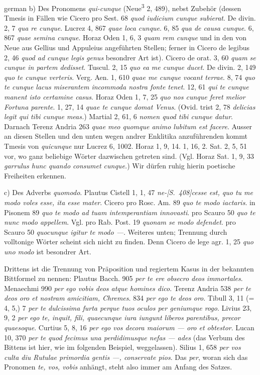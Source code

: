 \begin{otherlanguage*}{german}
b)	Des Pronomens \emph{qui-cunque} (Neue\textsuperscript{3} 2, 489), nebst Zubehör (dessen Tmesis in Fällen wie Cicero pro Sest. 68 \emph{quod iudicium cunque subierat}. De divin. 2, 7 \emph{qua re cunque}. Lucrez 4, 867 \emph{quae loca cunque}. 6, 85 \emph{qua de causa cunque}. 6, 867 \emph{quae semina cunque}. Horaz Oden 1, 6, 3 \emph{quam rem cunque} und in den von Neue aus Gellius und Appuleius angeführten Stellen; ferner in Cicero de legibus 2, 46 \emph{quod ad cunque legis genus} besondrer Art ist). Cicero de orat. 3, 60 \emph{quam se cunque in partem dedisset}. Tuscul. 2, 15 \emph{quo ea me cunque ducet}. De divin. 2, 149 \emph{quo te cunque verteris}. Verg. Aen. 1, 610 \emph{quae me cunque vocant terrae}. 8, 74 \emph{quo te cunque lacus miserantem incommoda nostra fonte tenet}. 12, 61 \emph{qui te cunque manent isto certamine casus}. Horaz Oden 1, 7, 25 \emph{quo nos cunque feret melior Fortuna parente}. 1, 27, 14 \emph{quae te cunque domat Venus}. (Ovid. trist 2, 78 \emph{delicias legit qui tibi cunque meas.}) Martial 2, 61, 6 \emph{nomen quod tibi cunque datur}. Darnach Terenz Andria 263 \emph{quae meo quomque animo lubitum est facere}. Ausser an diesen Stellen und den unten wegen andrer Enklitika anzuführenden kommt Tmesis von \emph{quicunque} nur Lucrez 6, 1002. Horaz 1, 9, 14. 1, 16, 2. Sat. 2, 5, 51 vor, wo ganz beliebige Wörter dazwischen getreten sind. (Vgl. Horaz Sat. 1, 9, 33 \emph{garrulus hunc quando consumet cunque.}) Wir dürfen ruhig hierin poetische Freiheiten erkennen.

c)	Des Adverbs \emph{quomodo}. Plautus Cistell 1, 1, 47 \emph{ne-}\hypertarget{p408}{\emph{[S.~408]}}\label{p408}\emph{cesse est, quo tu me modo voles esse, ita esse mater}. Cicero pro Rosc. Am. 89 \emph{quo te modo iactaris}. in Pisonem 89 \emph{quo te modo ad tuam intemperantiam innovasti}. pro Scauro 50 \emph{quo te nunc modo appellem}. Vgl. pro Rab. Post. 19 \emph{quonam se modo defendet}. pro Scauro 50 \emph{quocunque igitur te modo —}. Weiteres unten; Trennung durch volltonige Wörter scheint sich nicht zu finden. Denn Cicero de lege agr. 1, 25 \emph{quo uno modo} ist besondrer Art.

Drittens ist die Trennung von Präposition und regiertem Kasus in der bekannten Bittformel zu nennen: Plautus Bacch. 905 \emph{per te ere obsecro deos immortales}. Menaechmi 990 \emph{per ego vobis deos atque homines dico}. Terenz Andria 538 \emph{per te deos oro et nostram amicitiam, Chremes}. 834 \emph{per ego te deos oro}. Tibull 3, 11 (= 4, 5,) 7 \emph{per te dulcissima furta perque tuos oculos per geniumque rogo}. Livius 23, 9, 2 \emph{per ego te, inquit, fili, quaecunque iura iungunt liberos parentibus, precor quaesoque}. Curtius 5, 8, 16 \emph{per ego vos decora maiorum — oro et obtestor}. Lucan 10, 370 \emph{per te quod fecimus una perdidimusque nefas — ades} (das Verbum des Bittens ist hier, wie im folgenden Beispiel, weggelassen). Silius 1, 658 \emph{per vos culta diu Rutulae primordia gentis —, conservate pios}. Das \emph{per}, woran sich das Pronomen \emph{te, vos, vobis} anhängt, steht also immer am Anfang des Satzes.


\end{otherlanguage*}
